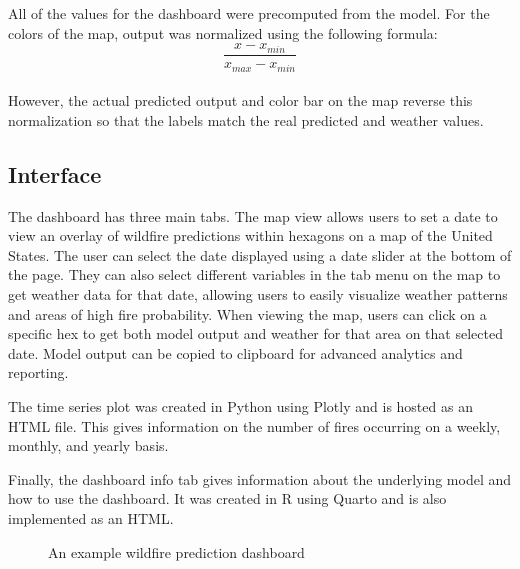 \documentclass[
  12pt,
  letterpaper,
  DIV=11,
  numbers=noendperiod]{scrartcl}
\begin{document}
All of the values for the dashboard were precomputed from the model. For
the colors of the map, output was normalized using the following
formula:\\
\[\frac{x - x_{min}}{x_{max} - x_{min}}\]\\
However, the actual predicted output and color bar on the map reverse
this normalization so that the labels match the real predicted and
weather values.

\subsection{Interface}\label{interface}

The dashboard has three main tabs. The map view allows users to set a
date to view an overlay of wildfire predictions within hexagons on a map
of the United States. The user can select the date displayed using a
date slider at the bottom of the page. They can also select different
variables in the tab menu on the map to get weather data for that date,
allowing users to easily visualize weather patterns and areas of high
fire probability. When viewing the map, users can click on a specific
hex to get both model output and weather for that area on that selected
date. Model output can be copied to clipboard for advanced analytics and
reporting.

The time series plot was created in Python using Plotly and is hosted as
an HTML file. This gives information on the number of fires occurring on
a weekly, monthly, and yearly basis.

Finally, the dashboard info tab gives information about the underlying
model and how to use the dashboard. It was created in R using Quarto and
is also implemented as an HTML.

\begin{figure}[H]


\caption{\label{fig-dashboard}An example wildfire prediction dashboard}

\end{figure}%
\end{document}
